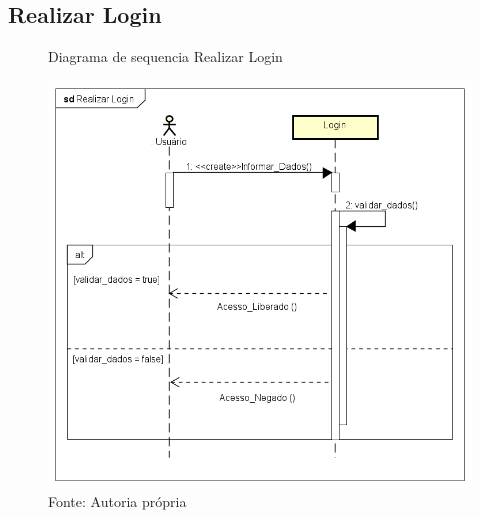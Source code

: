 \documentclass{utfpr-pg}
\begin{document}
    \subsection{Realizar Login}
        \begin{figure}[H]
            \centering
            \captionsetup{width=0.9\textwidth}
            \caption{Diagrama de sequencia Realizar Login}
            \includegraphics[width=\linewidth]{fotos/seq1.png}
            \caption*{Fonte: Autoria própria}
            \label{fig:Diagrama de Classes}
        \end{figure}
        
\end{document}
